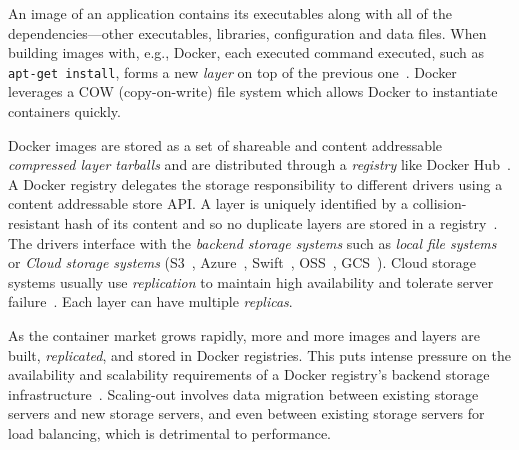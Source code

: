 %
%
An image of an application contains its executables 
along with all of the dependencies---other executables, libraries, configuration
and data files.
%
When building images with, e.g., Docker, each executed command
executed, such as \texttt{apt-get install}, forms a new \emph{layer} on top of
the previous one~.
%
Docker leverages a COW (copy-on-write) file system which allows Docker to
instantiate containers quickly. 
%
%
%


%
%
Docker images are stored as a set of shareable and content addressable
\emph{compressed layer tarballs} and are distributed through a \emph{registry}
like Docker Hub~\cite{docker-hub}.
%
A Docker registry delegates the storage responsibility to different drivers
using a content addressable store API.
%
A layer is uniquely identified by a collision-resistant hash of its content and
so no duplicate layers are stored in a registry~\cite{docker-hub}.
%
The drivers interface with the \emph{backend storage systems} such as
\emph{local file systems} or \emph{Cloud storage systems} (\eg S3~\cite{s3},
Azure~\cite{azuredriver}, Swift~\cite{swift}, OSS~\cite{oss}, GCS~\cite{gcs}).
%
Cloud storage systems usually use \emph{replication} to maintain high availability and tolerate server failure~\cite{Bonvin:2010:SFS:1807128.1807162}.
%
Each layer can have multiple \emph{replicas}.


%
%
As the container market grows rapidly, more and more images and layers are
built, \emph{replicated}, and stored in Docker registries.
%
This puts intense pressure on the availability and scalability requirements of
a Docker registry's backend storage infrastructure~\cite{5655241}. 
%
Scaling-out involves data migration between existing storage servers and new
storage servers, and even between existing storage servers for load balancing,
which is detrimental to performance.

